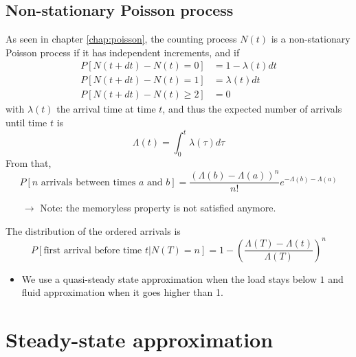 \documentclass[12pt, openany]{report}
\theoremstyle{definition}
\begin{document}
\subsection{Non-stationary Poisson process}
As seen in chapter \ref{chap:poisson}, the counting process $N(t)$ is a non-stationary Poisson process if it has independent increments, and if 
\begin{equation}
	\begin{aligned}
		P[N(t+dt)-N(t)=0] &= 1-\lambda(t)dt\\
		P[N(t+dt)-N(t)=1] &= \lambda(t)dt\\
		P[N(t+dt)-N(t)\ge 2] &= 0
	\end{aligned}
\end{equation}
with $\lambda(t)$ the arrival time at time $t$, and thus the expected number of arrivals until time $t$ is 
\begin{equation}
	\Lambda(t) = \int_0^t \lambda(\tau)d\tau
\end{equation}
From that, 
\begin{equation}
	P[n\text{ arrivals between times }a\text{ and }b] = \frac{(\Lambda(b)-\Lambda(a))^n}{n!}e^{-\Lambda(b)-\Lambda(a)}
\end{equation}
\begin{itemize}
	\item [$\to$] Note: the memoryless property is not satisfied anymore. 
\end{itemize}
The distribution of the ordered arrivals is 
\begin{equation}
	P[\text{first arrival before time }t|N(T)=n] = 1-\left(\frac{\Lambda(T)-\Lambda(t)}{\Lambda(T)}\right)^n 
\end{equation}
\begin{itemize}
	\item We use a quasi-steady state approximation when the load stays below $1$ and fluid approximation when it goes higher than 1. 
\end{itemize}
\section{Steady-state approximation}
\end{document}
